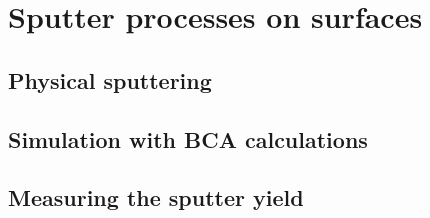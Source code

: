 \chapter{Sputter processes on surfaces}
\pagedecoration

\section{Physical sputtering}
\newpage
\section{Simulation with BCA calculations}

\section{Measuring the sputter yield}







